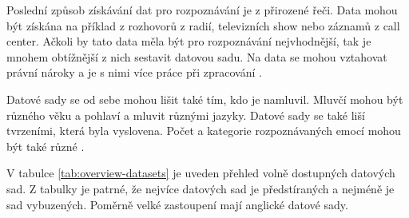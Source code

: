 \documentclass[FM,BP]{tulthesis}
\begin{document}
Poslední způsob získávání dat pro rozpoznávání je z přirozené řeči. Data mohou být získána na příklad z rozhovorů z radií, televizních show nebo záznamů z call center. Ačkoli by tato data měla být pro rozpoznávání nejvhodnější, tak je mnohem obtížnější z nich sestavit datovou sadu. Na data se mohou vztahovat právní nároky a je s nimi více práce při zpracování \cite{DBLP:journals/speech/AkcayO20}.

Datové sady se od sebe mohou lišit také tím, kdo je namluvil. Mluvčí mohou být různého věku a pohlaví a mluvit různými jazyky. Datové sady se také liší tvrzeními, která byla vyslovena. Počet a kategorie rozpoznávaných emocí mohou být také různé \cite{DBLP:journals/speech/AkcayO20}.

V tabulce \ref{tab:overview-datasets} je uveden přehled volně dostupných datových sad. Z tabulky je patrné, že nejvíce datových sad je předstíraných a nejméně je sad vybuzených. Poměrně velké zastoupení mají anglické datové sady.
\end{document}
